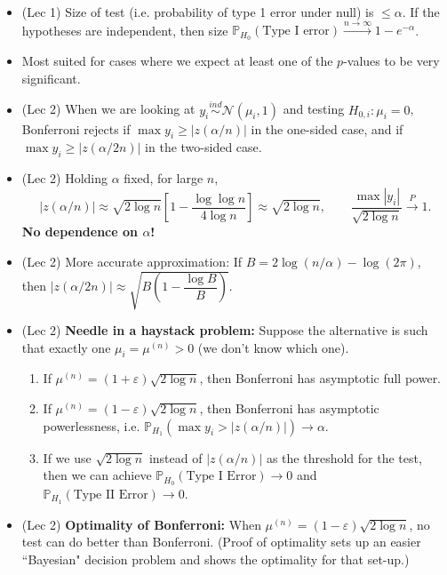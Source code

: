 \documentclass[twoside]{article}
\newcommand\bbP{\mathbb{P}}
\newcommand\calN{\mathcal{N}}
\def\eps{\varepsilon}
\newcommand\cp{\stackrel{P}{\goesto}}
\newcommand\goesto{\rightarrow}
\begin{document}
\begin{itemize}
\item (Lec 1) Size of test (i.e. probability of type 1 error under null) is $\leq \alpha$. If the hypotheses are independent, then size $\bbP_{H_0} (\text{Type I error}) \xrightarrow{n \goesto \infty} 1 - e^{-\alpha}$.

\item Most suited for cases where we expect at least one of the $p$-values to be very significant.

\item (Lec 2) When we are looking at $y_i \stackrel{ind}{\sim} \calN(\mu_i, 1)$ and testing $H_{0,i}: \mu_i = 0$, Bonferroni rejects if $\max y_i \geq |z(\alpha/n)|$ in the one-sided case, and if $\max y_i \geq |z(\alpha/2n)|$ in the two-sided case.

\item (Lec 2) Holding $\alpha$ fixed, for large $n$,
\[ |z(\alpha/n)| \approx \sqrt{2\log n} \left[1 - \frac{\log\log n}{4\log n} \right] \approx \sqrt{2 \log n}, \qquad \frac{\max |y_i|}{\sqrt{2 \log n}} \cp 1. \]
\textbf{No dependence on $\alpha$!}

\item (Lec 2) More accurate approximation: If $B = 2 \log (n/\alpha) - \log (2\pi)$, then $|z(\alpha/2n)| \approx \sqrt{B \left(1 - \dfrac{\log B}{B} \right)}$.

\item (Lec 2) \textbf{Needle in a haystack problem:} Suppose the alternative is such that exactly one $\mu_i = \mu^{(n)} > 0$ (we don't know which one).
\begin{enumerate}
\item If $\mu^{(n)} = (1 + \eps)\sqrt{2 \log n}$, then Bonferroni has asymptotic full power.

\item If $\mu^{(n)} = (1 - \eps)\sqrt{2 \log n}$, then Bonferroni has asymptotic powerlessness, i.e. $\bbP_{H_1}(\max y_i > |z(\alpha/n)|) \goesto \alpha$.

\item If we use $\sqrt{2 \log n}$ instead of $|z(\alpha/n)|$ as the threshold for the test, then we can achieve $\bbP_{H_0}(\text{Type I Error}) \goesto 0$ and $\bbP_{H_1}(\text{Type II Error}) \goesto 0$.
\end{enumerate}

\item (Lec 2) \textbf{Optimality of Bonferroni:} When $\mu^{(n)} = (1-\eps)\sqrt{2 \log n}$, no test can do better than Bonferroni. (Proof of optimality sets up an easier ``Bayesian" decision problem and shows the optimality for that set-up.)

\end{itemize}
\end{document}
